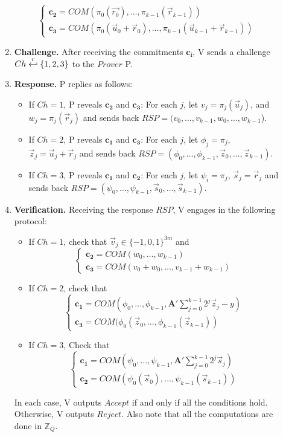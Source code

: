 \begin{description}
\begin{enumerate}
\[\begin{cases}
        \mathbf{c_2} = COM(\pi_0(\vec{r_0}), \dots,
        \pi_{k-1}(\vec{r}_{k-1}))\\
        \mathbf{c_3} = COM(\pi_0(\vec{u}_0 + \vec{r}_0), \dots, \pi_{k-1}(\vec{u}_{k-1} + \vec{r}_{k-1}))
      \end{cases}
    \]
  \item \textbf{Challenge.} After receiving the commitments $\mathbf{c_i}$, V sends a challenge
    $Ch \stackrel{r}{\hookleftarrow} \{1,2,3\}$ to the $Prover$ P.
  \item \textbf{Response.} P replies as follows:
    \begin{itemize}
    \item If $Ch = 1$, P reveals $\mathbf{c_2}$ and $\mathbf{c_3}$: For each $j$, let $v_j = \pi_j(\vec{u}_j)$, and
      $w_j = \pi_j(\vec{r}_j)$ and sends back $RSP = (v_0,\dots, v_{k-1},w_0,\dots,w_{k-1}$).
    \item If $Ch = 2$, P reveals $\mathbf{c_1}$ and $\mathbf{c_3}$: For each $j$, let $\phi_j = \pi_j$,
      $\vec{z}_j = \vec{u}_j +\vec{r}_j$ and sends back
      $RSP = (\phi_0,\dots,\phi_{k-1}, \vec{z}_0, \dots, \vec{z}_{k-1})$.
    \item If $Ch = 3$, P reveals $\mathbf{c_1}$ and $\mathbf{c_2}$: For each $j$, let $\psi_i = \pi_j$,
      $\vec{s}_j = \vec{r}_j$ and sends back $RSP = (\psi_0, \dots, \psi_{k-1}, \vec{s}_0, \dots, \vec{s}_{k-1})$.
    \end{itemize}
  \item \textbf{Verification.} Receiving the response $RSP$, V engages in the following protocol:
    \begin{itemize}
    \item If $Ch = 1$, check that $\vec{v}_j \in \{-1,0,1\}^{3m}$ and
      \[
        \begin{cases}
          \mathbf{c_2} = COM(w_0,\dots,w_{k-1})\\
          \mathbf{c_3} = COM(v_0 + w_0, \dots, v_{k-1} + w_{k-1})
        \end{cases}
      \]
    \item If $Ch = 2$, check that
      \[
        \begin{cases}
          \mathbf{c_1} = COM(\phi_0,\dots,\phi_{k-1},\mathbf{A'}
          \sum_{j=0}^{k-1}2^j\vec{z}_j - y)\\
          \mathbf{c_3} = COM(\phi_0(\vec{z}_0,\dots,\phi_{k-1}( \vec{z}_{k-1}))
        \end{cases}
      \]
    \item If $Ch = 3$, Check that
      \[
        \begin{cases}
          \mathbf{c_1} = COM(\psi_0, \dots, \psi_{k-1}, \mathbf{A'}
          \sum_{j=0}^{k-1}2^j\vec{s}_j)\\
          \mathbf{c_2} = COM(\psi_0(\vec{s}_0),\dots, \psi_{k-1}( \vec{s}_{k-1}))
        \end{cases}
      \]
    \end{itemize}
    In each case, V outputs $Accept$ if and only if all the conditions hold. Otherwise, V outputs $Reject$. Also note
    that all the computations are done in $\mathbb{Z}_Q$.


\end{enumerate}
\end{description}
